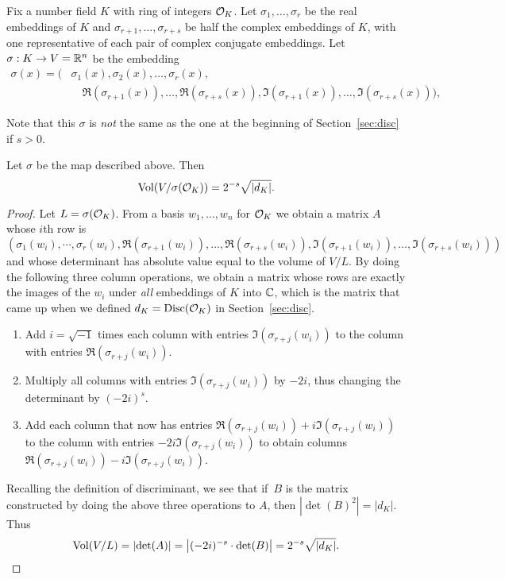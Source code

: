 Fix a number field $K$ with ring of integers $\mathcal{O}_K$.
Let $\sigma_1,\ldots, \sigma_r$ be the real embeddings
of $K$ and $\sigma_{r+1},\ldots, \sigma_{r+s}$ be half
the complex embeddings of $K$, with one representative of
each pair of complex conjugate embeddings.
Let $\sigma:K \to V=\mathbb{R}^n$ be the embedding
\begin{align*}
	\sigma(x) = \big(&\sigma_1(x), \sigma_2(x),\ldots, \sigma_r(x), \\
	&\quad \Re(\sigma_{r+1}(x)), \ldots, \Re(\sigma_{r+s}(x)),
	\Im(\sigma_{r+1}(x)), \ldots, \Im(\sigma_{r+s}(x))\big),
\end{align*}
\begin{warning}
	Note that this $\sigma$ is {\em not} the same as the one
	at the beginning of Section~\ref{sec:disc} if $s>0$.
\end{warning}
\begin{lemma}\label{lem:volok}
	Let $\sigma$ be the map described above. Then
	$$
		\operatorname{Vol}(V/\sigma(\mathcal{O}_K)) = 2^{-s} \sqrt{\left|d_K\right|}.
	$$
\end{lemma}
\begin{proof}
	Let $L=\sigma(\mathcal{O}_K)$.
	From a basis $w_1,\ldots, w_n$ for $\mathcal{O}_K$ we obtain a matrix $A$
	whose $i$th row is
	$$
		(\sigma_1(w_i), \cdots, \sigma_r(w_i),
		\Re(\sigma_{r+1}(w_i)),\ldots, \Re(\sigma_{r+s}(w_i)),
		\Im(\sigma_{r+1}(w_i)),\ldots, \Im(\sigma_{r+s}(w_i)))
	$$
	and whose determinant has absolute value equal to the volume
	of $V/L$.  By doing the following three column operations,
	we obtain a matrix whose rows are exactly the images of
	the $w_i$ under {\em all} embeddings of $K$ into $\mathbb{C}$, which
	is the matrix that came up when we defined
	$d_K=\operatorname{Disc}(\mathcal{O}_K)$ in Section~\ref{sec:disc}.
	\begin{enumerate}
		\item
		Add $i=\sqrt{-1}$ times each column with entries $\Im(\sigma_{r+j}(w_i))$
		to the column with entries $\Re(\sigma_{r+j}(w_i))$.
		\item
		Multiply all columns with entries $\Im(\sigma_{r+j}(w_i))$
		by $-2i$, thus changing the determinant by $(-2i)^s$.
		\item
		Add each column that now has entries
		$\Re(\sigma_{r+j}(w_i))+i\Im(\sigma_{r+j}(w_i))$
		to the column with entries $-2i\Im(\sigma_{r+j}(w_i))$
		to obtain columns $\Re(\sigma_{r+j}(w_i))-i\Im(\sigma_{r+j}(w_i))$.
	\end{enumerate}
	Recalling the definition of discriminant, we see that if~$B$
	is the matrix constructed by doing the above three
	operations to $A$, then $\left|\det(B)^2\right| = \left|d_K\right|$.
	Thus
	$$
		\operatorname{Vol}(V/L)
		= \left|\det(A)\right|
		= \left|(-2i)^{-s}\cdot \det(B)\right|
		= 2^{-s}\sqrt{\left|d_K\right|}.
	$$
\end{proof}

